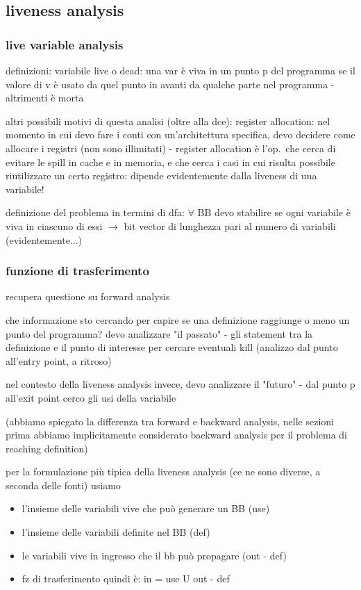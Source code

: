 \subsection{liveness analysis}

\subsubsection{live variable analysis}

definizioni: variabile live o dead: una var \`e viva in un punto p del programma se il valore di v \`e usato da quel punto in avanti da qualche parte nel programma - altrimenti \`e morta

altri possibili motivi di questa analisi (oltre alla dce): register allocation: nel momento in cui devo fare i conti con un'architettura specifica, devo decidere come allocare i registri (non sono illimitati) - register allocation \`e l'op.~che cerca di evitare le spill in cache e in memoria, e che cerca i casi in cui risulta possibile riutilizzare un certo registro: dipende evidentemente dalla liveness di una variabile!

definizione del problema in termini di dfa: $\forall$ BB devo stabilire se ogni variabile \`e viva in ciascuno di essi $\rightarrow$ bit vector di lunghezza pari al numero di variabili (evidentemente...)

\subsubsection{funzione di trasferimento}

recupera questione su forward analysis

che informazione sto cercando per capire se una definizione raggiunge o meno un punto del programma? devo analizzare "il passato" - gli statement tra la definizione e il punto di interesse per cercare eventuali kill (analizzo dal punto all'entry point, a ritroso)

nel contesto della liveness analysis invece, devo analizzare il "futuro" - dal punto p all'exit point cerco gli usi della variabile

(abbiamo spiegato la differenza tra forward e backward analysis, nelle sezioni prima abbiamo implicitamente considerato backward analysis per il problema di reaching definition)

per la formulazione pi\`u tipica della liveness analysis (ce ne sono diverse, a seconda delle fonti) usiamo
\begin{itemize}
  \item l'insieme delle variabili vive che pu\`o generare un BB (use)
  \item l'insieme delle variabili definite nel BB (def)
  \item le variabili vive in ingresso che il bb pu\`o propagare (out - def)
  \item fz di trasferimento quindi \`e: in = use U out - def
\end{itemize}


